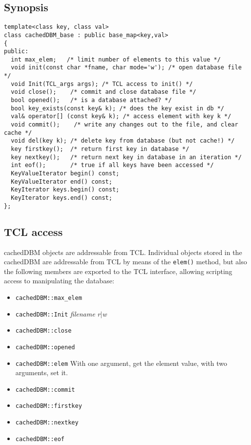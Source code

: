 \subsection{Synopsis}

\begin{verbatim}
template<class key, class val>
class cachedDBM_base : public base_map<key,val>
{
public:
  int max_elem;   /* limit number of elements to this value */
  void init(const char *fname, char mode='w'); /* open database file */
  void Init(TCL_args args); /* TCL access to init() */
  void close();    /* commit and close database file */
  bool opened();   /* is a database attached? */
  bool key_exists(const key& k); /* does the key exist in db */
  val& operator[] (const key& k); /* access element with key k */
  void commit();    /* write any changes out to the file, and clear cache */
  void del(key k); /* delete key from database (but not cache!) */    
  key firstkey();  /* return first key in database */
  key nextkey();   /* return next key in database in an iteration */ 
  int eof();       /* true if all keys have been accessed */
  KeyValueIterator begin() const;
  KeyValueIterator end() const;
  KeyIterator keys.begin() const;
  KeyIterator keys.end() const;
};
\end{verbatim}

\subsection{TCL access}

cachedDBM objects are addressable from TCL. Individual
objects stored in the cachedDBM are addressable from TCL by means of
the \verb+elem()+ method, but also the following members are
exported to the TCL interface, allowing scripting access to
manipulating the database:

\begin{itemize}
\item \verb+cachedDBM::max_elem+
\item \verb+cachedDBM::Init+ {\em filename} {\em r$|$w}
\item \verb+cachedDBM::close+
\item \verb+cachedDBM::opened+
\item \verb+cachedDBM::elem+ With one argument, get the element value,
  with two arguments, set it.
\item \verb+cachedDBM::commit+
\item \verb+cachedDBM::firstkey+
\item \verb+cachedDBM::nextkey+
\item \verb+cachedDBM::eof+
\end{itemize}

